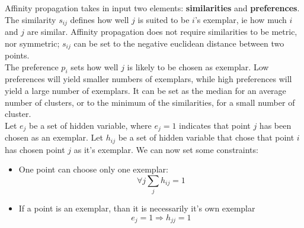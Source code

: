 \documentclass{ipol}
\begin{document}
Affinity propagation takes in input two elements: \textbf{similarities} and
\textbf{preferences}. The similarity $s_{ij}$ defines how well $j$ is suited to be
$i$'s exemplar, ie how much $i$ and $j$ are similar. Affinity propagation
does not require similarities to be metric, nor symmetric; $s_{ij}$ can be set
to the negative euclidean distance between two points. \\
The preference $p_i$ sets how well $j$ is likely to be chosen as exemplar.
Low preferences will yield smaller numbers of exemplars, while high
preferences will yield a large number of exemplars. It can be set as the median
for an average number of clusters, or to the minimum of the similarities, for
a small number of cluster. \\
Let $e_j$ be a set of hidden variable, where $e_j = 1$ indicates that point
$j$ has been chosen as an exemplar. Let $h_{ij}$ be a set of hidden variable
that chose that point $i$ has chosen point $j$ as it's exemplar. We can now
set some constraints:
\begin{itemize}
\item One point can choose only one exemplar:
\begin{equation*}
\forall j \sum_{j} h_{ij} = 1
\end{equation*}
\item If a point is an exemplar, than it is necessarily it's own exemplar
\begin{equation*}
e_{j} = 1 \Rightarrow h_{jj} = 1
\end{equation*}
\end{itemize}
\end{document}
